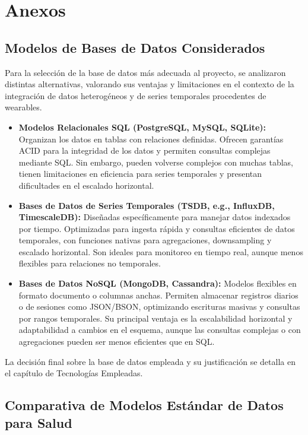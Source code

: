 \section{Anexos}

\subsection{Modelos de Bases de Datos Considerados}

Para la selección de la base de datos más adecuada al proyecto, se analizaron distintas alternativas, valorando sus ventajas y limitaciones en el contexto de la integración de datos heterogéneos y de series temporales procedentes de wearables.

\begin{itemize}
    \item \textbf{Modelos Relacionales SQL (PostgreSQL, MySQL, SQLite):} Organizan los datos en tablas con relaciones definidas. Ofrecen garantías ACID para la integridad de los datos y permiten consultas complejas mediante SQL. Sin embargo, pueden volverse complejos con muchas tablas, tienen limitaciones en eficiencia para series temporales y presentan dificultades en el escalado horizontal.
    \item \textbf{Bases de Datos de Series Temporales (TSDB, e.g., InfluxDB, TimescaleDB):} Diseñadas específicamente para manejar datos indexados por tiempo. Optimizadas para ingesta rápida y consultas eficientes de datos temporales, con funciones nativas para agregaciones, downsampling y escalado horizontal. Son ideales para monitoreo en tiempo real, aunque menos flexibles para relaciones no temporales.
    \item \textbf{Bases de Datos NoSQL (MongoDB, Cassandra):} Modelos flexibles en formato documento o columnas anchas. Permiten almacenar registros diarios o de sesiones como JSON/BSON, optimizando escrituras masivas y consultas por rangos temporales. Su principal ventaja es la escalabilidad horizontal y adaptabilidad a cambios en el esquema, aunque las consultas complejas o con agregaciones pueden ser menos eficientes que en SQL.
\end{itemize}

La decisión final sobre la base de datos empleada y su justificación se detalla en el capítulo de Tecnologías Empleadas.

\subsection{Comparativa de Modelos Estándar de Datos para Salud}

